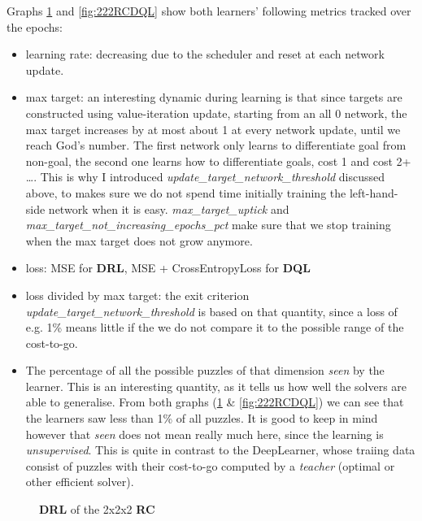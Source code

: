 \noindent Graphs \ref{fig:222RCDRL} and \ref{fig:222RCDQL} show both learners' following metrics tracked over the epochs:
\begin{itemize}
\item learning rate: decreasing due to the scheduler and reset at each network update.
\item max target: an interesting dynamic during learning is that since targets are constructed using value-iteration update, starting from an all 0 network, the max target increases by at most about 1 at every network update, until we reach God's number. The first network only learns to differentiate goal from non-goal, the second one learns how to differentiate goals, cost 1 and cost 2+ \dots. This is why I introduced \textit{update\_target\_network\_threshold} discussed above, to makes sure we do not spend time initially training the left-hand-side network when it is easy. \textit{max\_target\_uptick} and \textit{max\_target\_not\_increasing\_epochs\_pct} make sure that we stop training when the max target does not grow anymore.
\item loss: MSE for \textbf{DRL}, MSE + CrossEntropyLoss for \textbf{DQL}
\item loss divided by max target: the exit criterion \textit{update\_target\_network\_threshold} is based on that quantity, since a loss of e.g. 1\% means little if the we do not compare it to the possible range of the cost-to-go.
\item The percentage of all the possible puzzles of that dimension \textit{seen} by the learner. This is an interesting quantity, as it tells us how well the solvers are able to generalise. From both graphs (\ref{fig:222RCDRL} \& \ref{fig:222RCDQL}) we can see that the learners saw less than 1\% of all puzzles. It is good to keep in mind however that \textit{seen} does not mean really much here, since the learning is \textit{unsupervised}. This is quite in contrast to the DeepLearner, whose traiing data consist of puzzles with their cost-to-go computed by a \textit{teacher} (optimal or other efficient solver).
\end{itemize}


\begin{figure}[H]
  \noindent
  \caption[222RCDRL]{\textbf{DRL} of the 2x2x2 \textbf{RC}}
  \label{fig:222RCDRL}
\end{figure}


